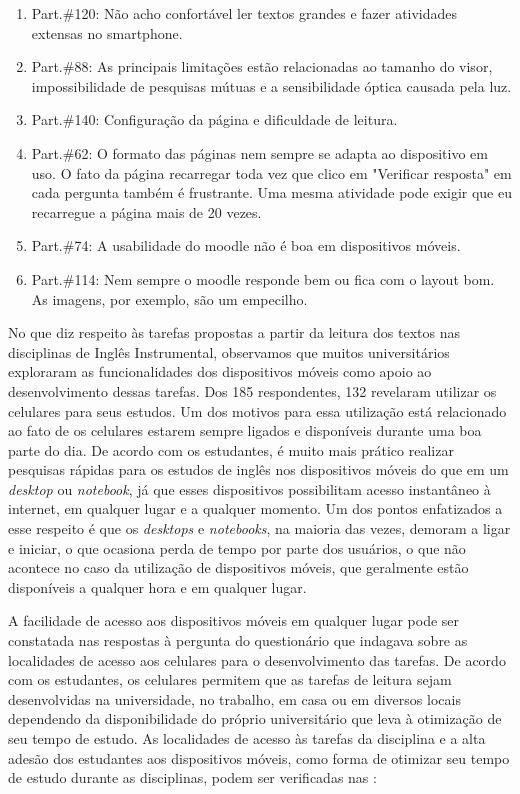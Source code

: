 \documentclass[portuguese]{textolivre}
\begin{document}
\begin{enumerate}[resume]
    \item Part.\#120: Não acho confortável ler textos grandes e fazer atividades extensas no smartphone.
    \item Part.\#88: As principais limitações estão relacionadas ao tamanho do visor, impossibilidade de pesquisas mútuas e a sensibilidade óptica causada pela luz.
    \item Part.\#140: Configuração da página e dificuldade de leitura.
    \item Part.\#62: O formato das páginas nem sempre se adapta ao dispositivo em uso. O fato da página recarregar toda vez que clico em "Verificar resposta" em cada pergunta também é frustrante. Uma mesma atividade pode exigir que eu recarregue a página mais de 20 vezes.
    \item Part.\#74: A usabilidade do moodle não é boa em dispositivos móveis.
    \item Part.\#114: Nem sempre o moodle responde bem ou fica com o layout bom. As imagens, por exemplo, são um empecilho.
\end{enumerate}

No que diz respeito às tarefas propostas a partir da leitura dos textos nas disciplinas de Inglês Instrumental, observamos que muitos universitários exploraram as funcionalidades dos dispositivos móveis como apoio ao desenvolvimento dessas tarefas. Dos 185 respondentes, 132 revelaram utilizar os celulares para seus estudos. Um dos motivos para essa utilização está relacionado ao fato de os celulares estarem sempre ligados e disponíveis durante uma boa parte do dia. De acordo com os estudantes, é muito mais prático realizar pesquisas rápidas para os estudos de inglês nos dispositivos móveis do que em um \emph{desktop} ou \emph{notebook}, já que esses dispositivos possibilitam acesso instantâneo à internet, em qualquer lugar e a qualquer momento. Um dos pontos enfatizados a esse respeito é que os \emph{desktops} e \emph{notebooks}, na maioria das vezes, demoram a ligar e iniciar, o que ocasiona perda de tempo por parte dos usuários, o que não acontece no caso da utilização de dispositivos móveis, que geralmente estão disponíveis a qualquer hora e em qualquer lugar.

A facilidade de acesso aos dispositivos móveis em qualquer lugar pode ser constatada nas respostas à pergunta do questionário que indagava sobre as localidades de acesso aos celulares para o desenvolvimento das tarefas. De acordo com os estudantes, os celulares permitem que as tarefas de leitura sejam desenvolvidas na universidade, no trabalho, em casa ou em diversos locais dependendo da disponibilidade do próprio universitário que leva à otimização de seu tempo de estudo. As localidades de acesso às tarefas da disciplina e a alta adesão dos estudantes aos dispositivos móveis, como forma de otimizar seu tempo de estudo durante as disciplinas, podem ser verificadas nas :
\end{document}

